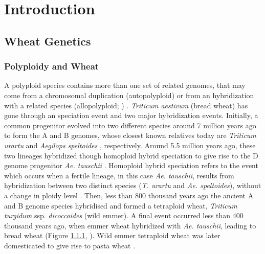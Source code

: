

\chapter{Introduction}



\section{Wheat Genetics}


\subsection{Polyploidy and Wheat}
\label{lit:polyploidy}

A polyploid species contains more than one set of related genomes, that may come from a chromosomal duplication (autopolyploid) or from an hybridization with a related species (allopolyploid; \citealt{Shewry2009}) . 
\textit{Triticum aestivum} (bread wheat) has gone through an speciation event and two major hybridization events. 
Initially, a common progenitor evolved into two different species around 7 million years ago to form the A and B genomes, whose closest known relatives today are \textit{Triticum urartu} and \textit{Aegilops speltoides} \citep{Dubcovsky2007}, respectively. 
Around 5.5 million years ago, these two lineages hybridized though homoploid hybrid speciation to give rise to the D genome progenitor \textit{Ae. tauschii} \citep{Marcussen2014,ElBaidouri2016}. Homoploid hybrid speciation refers to the event which occurs when a fertile lineage, in this case \textit{Ae. tauschii}, results from hybridization between two distinct species (\textit{T. urartu} and \textit{Ae. speltoides}), without a change in ploidy level \citep{Gross2012}.
Then, less than 800 thousand years ago the ancient A and B genome species hybridised and formed a tetraploid wheat, \textit{Triticum turgidum} ssp. \textit{dicoccoides} (wild emmer). 
A final event occurred less than 400 thousand years ago, when emmer wheat hybridized with \textit{Ae. tauschii}, leading to bread wheat (Figure \ref{lit:polyploidy}, \citealt{Marcussen2014}). Wild emmer tetraploid wheat was later domesticated to give rise to pasta wheat \citep{Dubcovsky2007}.  



